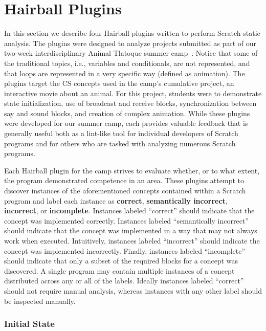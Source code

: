 \section{Hairball Plugins} 
In this section we describe four Hairball plugins written to perform Scratch
static analysis.  The plugins were designed to analyze projects submitted as
part of our two-week interdisciplinary Animal Tlatoque summer
camp~\cite{Franklin:2013:SBO}.  Notice that some of the traditional topics,
i.e., variables and conditionals, are not represented, and that loops are
represented in a very specific way (defined as animation). The plugins target
the CS concepts used in the camp's cumulative project, an interactive movie
about an animal. For this project, students were to demonstrate state
initialization, use of broadcast and receive blocks, synchronization between
say and sound blocks, and creation of complex animation. While these plugins
were developed for our summer camp, each provides valuable feedback that is
generally useful both as a lint-like tool for individual developers of Scratch
programs and for others who are tasked with analyzing numerous Scratch
programs.

Each Hairball plugin for the camp strives to evaluate whether, or to what
extent, the program demonstrated competence in an area. These plugins attempt
to discover instances of the aforementioned concepts contained within a Scratch
program and label each instance as {\bf correct}, {\bf semantically incorrect},
{\bf incorrect}, or {\bf incomplete}. Instances labeled ``correct'' should
indicate that the concept was implemented correctly. Instances labeled
``semantically incorrect'' should indicate that the concept was implemented in
a way that may not always work when executed. Intuitively, instances labeled
``incorrect'' should indicate the concept was implemented incorrectly. Finally,
instances labeled ``incomplete'' should indicate that only a subset of the
required blocks for a concept was discovered. A single program may contain
multiple instances of a concept distributed across any or all of the
labels. Ideally instances labeled ``correct'' should not require manual
analysis, whereas instances with any other label should be inspected manually.


\subsubsection*{Initial State}

